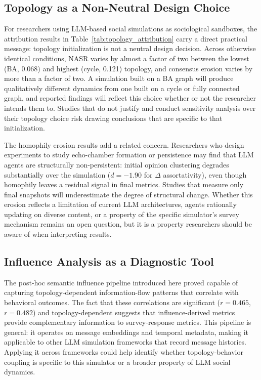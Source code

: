 \documentclass[11pt]{article}
\begin{document}
\subsection{Topology as a Non-Neutral Design Choice}

For researchers using LLM-based social simulations as sociological sandboxes, the attribution results in Table~\ref{tab:topology_attribution} carry a direct practical message: topology initialization is not a neutral design decision. Across otherwise identical conditions, NASR varies by almost a factor of two between the lowest (BA, 0.068) and highest (cycle, 0.121) topology, and consensus erosion varies by more than a factor of two. A simulation built on a BA graph will produce qualitatively different dynamics from one built on a cycle or fully connected graph, and reported findings will reflect this choice whether or not the researcher intends them to. Studies that do not justify and conduct sensitivity analysis over their topology choice risk drawing conclusions that are specific to that initialization.

The homophily erosion results add a related concern. Researchers who design experiments to study echo-chamber formation or persistence may find that LLM agents are structurally non-persistent: initial opinion clustering degrades substantially over the simulation ($d = -1.90$ for $\Delta$ assortativity), even though homophily leaves a residual signal in final metrics. Studies that measure only final snapshots will underestimate the degree of structural change. Whether this erosion reflects a limitation of current LLM architectures, agents rationally updating on diverse content, or a property of the specific simulator's survey mechanism remains an open question, but it is a property researchers should be aware of when interpreting results.

\subsection{Influence Analysis as a Diagnostic Tool}

The post-hoc semantic influence pipeline introduced here proved capable of capturing topology-dependent information-flow patterns that correlate with behavioral outcomes. The fact that these correlations are significant ($r = 0.465$, $r = 0.482$) and topology-dependent suggests that influence-derived metrics provide complementary information to survey-response metrics. This pipeline is general: it operates on message embeddings and temporal metadata, making it applicable to other LLM simulation frameworks that record message histories. Applying it across frameworks could help identify whether topology-behavior coupling is specific to this simulator or a broader property of LLM social dynamics.
\end{document}
